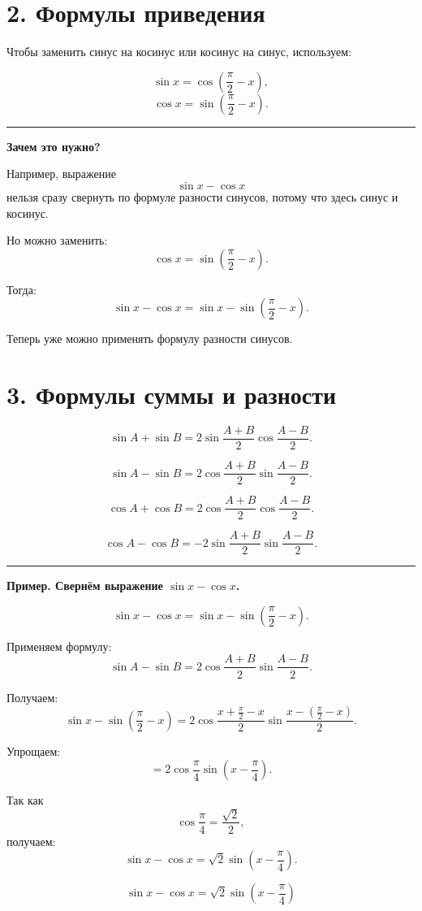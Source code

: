 \documentclass[a4paper,12pt]{article}
\newcommand{\sectionline}{%
\vspace{1mm}
\noindent\textcolor{lightline}{\rule{\linewidth}{0.8pt}}
\vspace{1mm}
}
\begin{document}
\section*{2. Формулы приведения}

Чтобы заменить синус на косинус или косинус на синус, используем:

\[
\sin x=\cos\left(\frac{\pi}{2}-x\right),
\]
\[
\cos x=\sin\left(\frac{\pi}{2}-x\right).
\]

\sectionline

\textbf{Зачем это нужно?}

Например, выражение
\[
\sin x-\cos x
\]
нельзя сразу свернуть по формуле разности синусов, потому что здесь синус и косинус.

Но можно заменить:
\[
\cos x=\sin\left(\frac{\pi}{2}-x\right).
\]

Тогда:
\[
\sin x-\cos x
=
\sin x-\sin\left(\frac{\pi}{2}-x\right).
\]

Теперь уже можно применять формулу разности синусов.

\section*{3. Формулы суммы и разности}

\[
\sin A+\sin B
=
2\sin\frac{A+B}{2}\cos\frac{A-B}{2}.
\]

\[
\sin A-\sin B
=
2\cos\frac{A+B}{2}\sin\frac{A-B}{2}.
\]

\[
\cos A+\cos B
=
2\cos\frac{A+B}{2}\cos\frac{A-B}{2}.
\]

\[
\cos A-\cos B
=
-2\sin\frac{A+B}{2}\sin\frac{A-B}{2}.
\]

\sectionline

\textbf{Пример. Свернём выражение \(\sin x-\cos x\).}

\[
\sin x-\cos x
=
\sin x-\sin\left(\frac{\pi}{2}-x\right).
\]

Применяем формулу:
\[
\sin A-\sin B
=
2\cos\frac{A+B}{2}\sin\frac{A-B}{2}.
\]

Получаем:
\[
\sin x-\sin\left(\frac{\pi}{2}-x\right)
=
2\cos\frac{x+\frac{\pi}{2}-x}{2}
\sin\frac{x-\left(\frac{\pi}{2}-x\right)}{2}.
\]

Упрощаем:
\[
=
2\cos\frac{\pi}{4}
\sin\left(x-\frac{\pi}{4}\right).
\]

Так как
\[
\cos\frac{\pi}{4}=\frac{\sqrt2}{2},
\]
получаем:
\[
\sin x-\cos x
=
\sqrt2\sin\left(x-\frac{\pi}{4}\right).
\]

\[
\boxed{\sin x-\cos x=\sqrt2\sin\left(x-\frac{\pi}{4}\right)}
\]
\end{document}
